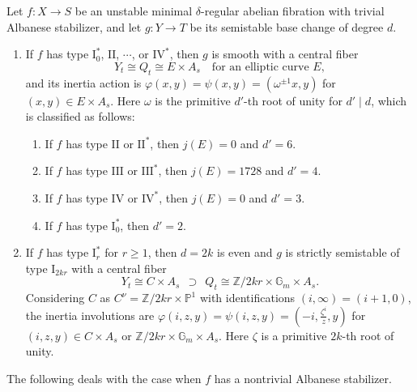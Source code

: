\documentclass[reqno, letterpaper]{amsart}
\numberwithin{equation}{subsection}
\let\to\longrightarrow
\newcommand{\GG}{\mathbb{G}}
\newcommand{\PP}{\mathbb{P}}
\newcommand{\ZZ}{\mathbb{Z}}
\begin{document}
		\begin{proposition} \label{prop:semistable reduction theorem untangled ver}
			Let $f : X \to S$ be an unstable minimal $\delta$-regular abelian fibration with trivial Albanese stabilizer, and let $g : Y \to T$ be its semistable base change of degree $d$.
			\begin{enumerate}
				\item If $f$ has type $\mathrm I_0^*$, $\mathrm{II}$, $\cdots$, or $\mathrm{IV}^*$, then $g$ is smooth with a central fiber
				\[ Y_t \cong Q_t \cong E \times A_s \quad \mbox{for an elliptic curve } E ,\]
				and its inertia action is $\varphi(x,y) = \psi(x,y) = (\omega^{\pm1} x, y)$ for $(x,y) \in E \times A_s$. Here $\omega$ is the primitive $d'$-th root of unity for $d' \mid d$, which is classified as follows:
				\begin{enumerate}
					\item If $f$ has type $\mathrm{II}$ or $\mathrm{II}^*$, then $j(E) = 0$ and $d' = 6$.
					\item If $f$ has type $\mathrm{III}$ or $\mathrm{III}^*$, then $j(E) = 1728$ and $d' = 4$.
					\item If $f$ has type $\mathrm{IV}$ or $\mathrm{IV}^*$, then $j(E) = 0$ and $d' = 3$.
					\item If $f$ has type $\mathrm I_0^*$, then $d' = 2$.
				\end{enumerate}
				
				\item If $f$ has type $\mathrm I_r^*$ for $r \ge 1$, then $d = 2k$ is even and $g$ is strictly semistable of type $\mathrm I_{2kr}$ with a central fiber
				\[ Y_t \cong C \times A_s \ \ \supset \ \ Q_t \cong \ZZ/2kr \times \GG_m \times A_s .\]
				Considering $C$ as $C^\nu = \ZZ/2kr \times \PP^1$ with identifications $(i,\infty) = (i+1, 0)$, the inertia involutions are $\varphi(i,z,y) = \psi(i,z,y) = (-i, \frac{\zeta^i}{z}, y)$ for $(i,z,y) \in C \times A_s$ or $\ZZ/2kr \times \GG_m \times A_s$. Here $\zeta$ is a primitive $2k$-th root of unity.
			\end{enumerate}
		\end{proposition}
		
		The following deals with the case when $f$ has a nontrivial Albanese stabilizer.
		
\end{document}
